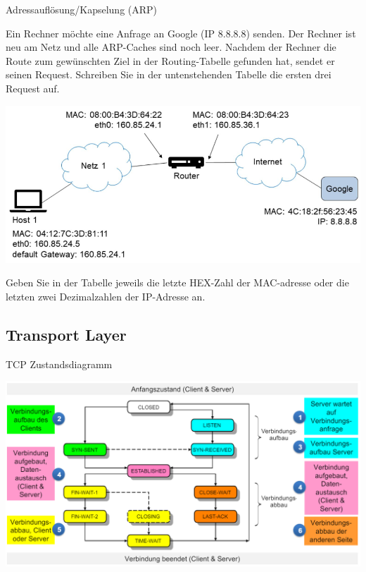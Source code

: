 \begin{example2}{Adressauflösung/Kapselung (ARP)}

  Ein Rechner möchte eine Anfrage an Google (IP 8.8.8.8) senden. Der Rechner ist neu am Netz und alle ARP-Caches sind noch leer. Nachdem der Rechner die Route zum gewünschten Ziel in der Routing-Tabelle gefunden hat, sendet er seinen Request. Schreiben Sie in der untenstehenden Tabelle die ersten drei Request auf.
  
  \includegraphics[width=0.9\linewidth]{images/arp_bsp.png}
  
  Geben Sie in der Tabelle jeweils die letzte HEX-Zahl der MAC-adresse oder die letzten zwei Dezimalzahlen der IP-Adresse an.

  \vspace{1mm}

\end{example2}

\subsection*{Transport Layer}

\begin{example2}{TCP Zustandsdiagramm}

  \includegraphics[width=1\linewidth]{images/zustandsdiagramm_tcp.png}
\end{example2}

